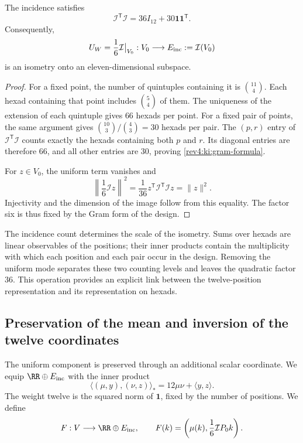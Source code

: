 \begin{lemma}
\label{rev4:ki:gram}
The incidence satisfies
\begin{equation}
 \mathcal I^{\mathsf T}\mathcal I
       =36I_{12}+30\mathbf1\mathbf1^{\mathsf T}.
 \label{rev4:ki:gram-formula}
\end{equation}
Consequently,
\[
 U_W=\frac16\mathcal I\big|_{V_0}:
 V_0\longrightarrow E_{\rm inc}:=\mathcal I(V_0)
\]
is an isometry onto an eleven-dimensional subspace.
\end{lemma}
\begin{proof}
For a fixed point, the number of quintuples containing it is
\(\binom{11}{4}\). Each hexad containing that point includes
\(\binom54\) of them. The uniqueness of the extension of each
quintuple gives \(66\) hexads per point. For a fixed pair of points,
the same argument gives \(\binom{10}{3}/\binom43=30\) hexads per
pair. The \((p,r)\) entry of
\(\mathcal I^{\mathsf T}\mathcal I\) counts exactly the hexads
containing both \(p\) and \(r\). Its diagonal entries are therefore
\(66\), and all other entries are \(30\), proving
\eqref{rev4:ki:gram-formula}.

For \(z\in V_0\), the uniform term vanishes and
\[
 \left\|\frac16\mathcal I z\right\|^2
 =\frac1{36}z^{\mathsf T}
       \mathcal I^{\mathsf T}\mathcal I z
 =\|z\|^2.
\]
Injectivity and the dimension of the image follow from this equality.
The factor six is thus fixed by the Gram form of the design.
\end{proof}

The incidence count determines the scale of the isometry. Sums over
hexads are linear observables of the positions; their inner products
contain the multiplicity with which each position and each pair occur
in the design. Removing the uniform mode separates these two counting
levels and leaves the quadratic factor \(36\). This operation provides
an explicit link between the twelve-position representation and its
representation on hexads.

\subsection{Preservation of the mean and inversion of the twelve coordinates}
\label{rev4:ki:full-subsection}

The uniform component is preserved through an additional scalar
coordinate. We equip \(\RR\oplus E_{\rm inc}\) with the inner
product
\[
 \langle(\mu,y),(\nu,z)\rangle_*=
 12\mu\nu+\langle y,z\rangle.
\]
The weight twelve is the squared norm of \(\mathbf1\), fixed by the
number of positions. We define
\begin{equation}
 F:V\longrightarrow\RR\oplus E_{\rm inc},\qquad
 F(k)=\left(\mu(k),\frac16\mathcal I P_0k\right).
 \label{rev4:ki:F}
\end{equation}

